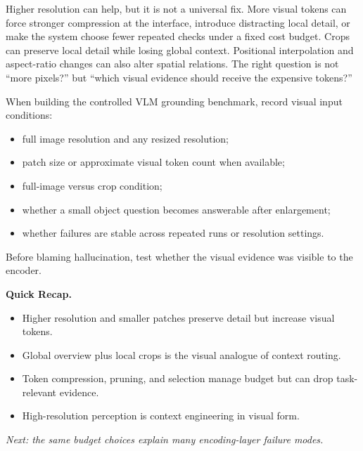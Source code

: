\begin{tcolorbox}[colback=blue!5, colframe=blue!40, title=\textbf{More Pixels Are Not Always More Evidence}]
Higher resolution can help, but it is not a universal fix. More visual tokens can force stronger compression at the interface, introduce distracting local detail, or make the system choose fewer repeated checks under a fixed cost budget. Crops can preserve local detail while losing global context. Positional interpolation and aspect-ratio changes can also alter spatial relations. The right question is not ``more pixels?'' but ``which visual evidence should receive the expensive tokens?''
\end{tcolorbox}

\begin{tcolorbox}[colback=orange!5, colframe=orange!60, title=\textbf{For Project~5: Encoding Experiments}]
When building the controlled VLM grounding benchmark, record visual input conditions:
\begin{itemize}[nosep,leftmargin=1.5em]
  \item full image resolution and any resized resolution;
  \item patch size or approximate visual token count when available;
  \item full-image versus crop condition;
  \item whether a small object question becomes answerable after enlargement;
  \item whether failures are stable across repeated runs or resolution settings.
\end{itemize}
Before blaming hallucination, test whether the visual evidence was visible to the encoder.
\end{tcolorbox}

\begin{quickrecap}
\textbf{Quick Recap.}
\begin{itemize}[nosep,leftmargin=1.5em]
  \item Higher resolution and smaller patches preserve detail but increase visual tokens.
  \item Global overview plus local crops is the visual analogue of context routing.
  \item Token compression, pruning, and selection manage budget but can drop task-relevant evidence.
  \item High-resolution perception is context engineering in visual form.
\end{itemize}
\textit{Next: the same budget choices explain many encoding-layer failure modes.}
\end{quickrecap}


